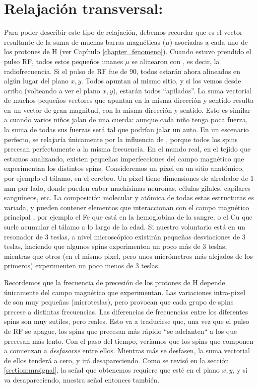 \section{Relajación transversal: \Ttwo}
Para poder describir este tipo de relajación, debemos recordar que \M es el vector resultante de la suma de muchas barras magnéticas ($\mu$) asociadas a cada uno de los protones de H (ver Capítulo \ref{chapter_fenomeno}). Cuando estuvo prendido el pulso RF, todos estos pequeños imanes $\mu$ se alinearon con \Bone, es decir, la radiofrecuencia. Si el pulso de RF fue de 90\degrees, todos estarán ahora alineados en algún lugar del plano $x,y$. Todos apuntan al mismo sitio, y si los vemos desde arriba (volteando a ver el plano $x,y$), estarán todos ``apilados''. La suma vectorial de muchos pequeños vectores que apuntan en la misma dirección y sentido resulta en un vector de gran magnitud, con la misma dirección y sentido. Esto es similar a cuando varios niños jalan de una cuerda: aunque cada niño tenga poca fuerza, la suma de todas sus fuerzas será tal que podrían jalar un auto. En un escenario perfecto, \M se relajaría únicamente por la influencia de \Tone, porque todos los spins precesan perfectamente a la misma frecuencia. En el mundo real, en el tejido que estamos analizando, existen pequeñas imperfecciones del campo magnético que experimentan los distintos spins. Consideremos un pixel en un sitio anatómico, por ejemplo el tálamo, en el cerebro. Un pixel tiene dimensiones de alrededor de 1 mm por lado, donde pueden caber muchísimas neuronas, células gilales, capilares sanguíneos, etc. La composición molecular y atómica de todas estas estructuras es variada, y pueden contener elementos que interaccionan con el campo magnético principal \Bzero, por ejemplo el Fe que está en la hemoglobina de la sangre, o el Cu que suele acumular el tálamo a lo largo de la edad. Si nuestro voluntario está en un resonador de 3 teslas, a nivel microscópico existirán pequeñas desviaciones de 3 teslas, haciendo que algunos spins experimenten un poco más de 3 teslas, mientras que otros (en el mismo pixel, pero unos micrómetros más alejados de los primeros) experimenten un poco menos de 3 teslas. 


Recordemos que la frecuencia de precesión \omegazero de los protones de H depende únicamente del campo magnético \Bzero que experimentan. Las variaciones intra-pixel de \Bzero son muy pequeñas (microteslas), pero provocan que cada grupo de spins precese a distintas frecuencias. Las diferencias de frecuencias entre los diferentes spins son muy sutiles, pero reales. Esto va a traducirse que, una vez que el pulso de RF se apague, los spins que precesan más rápido ``se adelanten`` a los que precesan más lento. Con el paso del tiempo, veríamos que los spins que componen a \M comienzan a \textit{desfasarse} entre ellos. Mientras más se desfasen, la suma vectorial de ellos tenderá a cero, y \M irá desapareciendo. Como se revisó en la sección \ref{section:mrsignal}, la señal que obtenemos requiere que \M esté en el plano $x,y$, y si \M va desapareciendo, nuestra señal entonces también.

